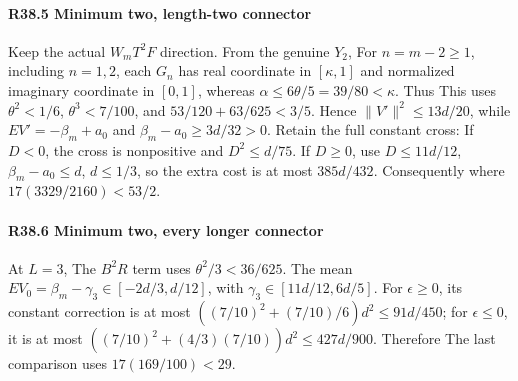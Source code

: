 \paragraph{R38.5 Minimum two, length-two connector}

Keep the actual \(W_mT^2F\) direction. From the genuine \(Y_2\),
For \(n=m-2\ge1\), including \(n=1,\allowbreak 2\), each \(G_n\) has real coordinate in \([\kappa,\allowbreak 1]\) and normalized imaginary coordinate in \([0,\allowbreak 1]\), whereas \(\alpha\le6\theta/5=39/80<\kappa\). Thus
This uses \(\theta^2<1/6\), \(\theta^3<7/100\), and \(53/120+63/625<3/5\). Hence \(\|V'\|^2\le13d/20\), while \(EV'=-\beta_m+a_0\) and \(\beta_m-a_0\ge3d/32>0\). Retain the full constant cross:
If \(D<0\), the cross is nonpositive and \(D^2\le d/75\). If \(D\ge0\), use \(D\le11d/12\), \(\beta_m-a_0\le d\), \(d\le1/3\), so the extra cost is at most \(385d/432\). Consequently
where \(17(3329/2160)<53/2\).

\paragraph{R38.6 Minimum two, every longer connector}

At \(L=3\),
The \(B^2R\) term uses \(\theta^2/3<36/625\). The mean \(EV_0=\beta_m-\gamma_3\in[-2d/3,\allowbreak d/12]\), with \(\gamma_3\in[11d/12,\allowbreak 6d/5]\). For \(\epsilon\ge0\), its constant correction is at most \(((7/10)^2+(7/10)/6)d^2\le91d/450\); for \(\epsilon\le0\), it is at most \(((7/10)^2+(4/3)(7/10))d^2\le427d/900\). Therefore
The last comparison uses \(17(169/100)<29\).

